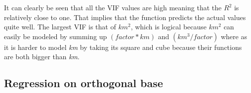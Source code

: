 \noindent
It can clearly be seen that all the VIF values are high meaning that the $R^2$ is relatively close to one. That implies that the function predicts the actual values quite well. The largest VIF is that of $km^2$, which is logical because $km^2$ can easily be modeled by summing up  $(factor * km)$ and $(km^3 / factor)$ where as it is harder to model \textit{km} by taking its square and cube because their functions are both bigger than \textit{km}.


\subsection{Regression on orthogonal base} %
\label{sub:regression_on_orthogonal_base}




